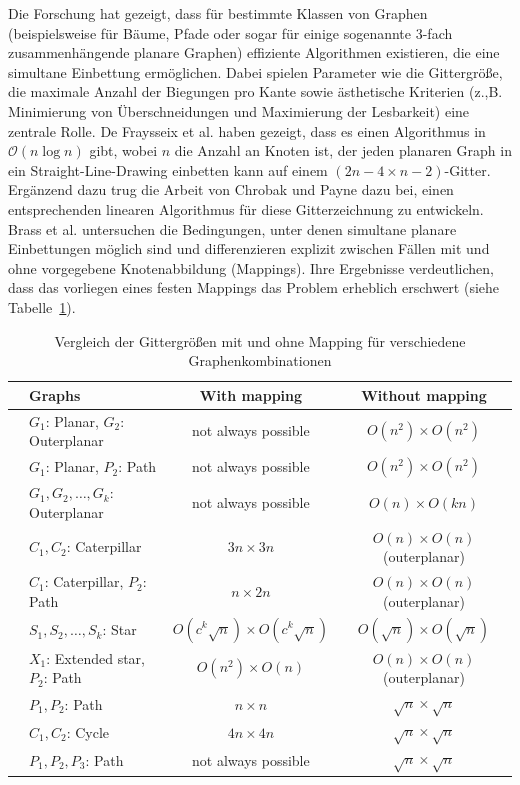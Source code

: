 \documentclass[bachelor, german]{algothesis}
\begin{document}
Die Forschung hat gezeigt, dass für bestimmte Klassen von Graphen (beispielsweise für Bäume, Pfade oder sogar für einige sogenannte 3-fach zusammenhängende planare Graphen) effiziente Algorithmen existieren, die eine simultane Einbettung ermöglichen. Dabei spielen Parameter wie die Gittergröße, die maximale Anzahl der Biegungen pro Kante sowie ästhetische Kriterien (z.,B. Minimierung von Überschneidungen und Maximierung der Lesbarkeit) eine zentrale Rolle.\newline
De Fraysseix et al. \cite{DeFraysseix1990} haben gezeigt, dass es einen Algorithmus in $\mathcal{O}(n \log n)$ gibt, wobei $n$ die Anzahl an Knoten ist, der jeden planaren Graph in ein Straight-Line-Drawing einbetten kann auf einem $(2n-4\times n-2)$-Gitter. Ergänzend dazu trug die Arbeit von Chrobak und Payne \cite{CHROBAK1995241} dazu bei, einen entsprechenden linearen Algorithmus für diese Gitterzeichnung zu entwickeln.\newline
Brass et al. \cite{BRASS2007117}  untersuchen die Bedingungen, unter denen simultane planare Einbettungen möglich sind und differenzieren explizit zwischen Fällen mit und ohne vorgegebene Knotenabbildung (Mappings). Ihre Ergebnisse verdeutlichen, dass das vorliegen eines festen Mappings das Problem erheblich erschwert (siehe Tabelle~\ref{tab:graph-mapping}).\newline
\begin{table}[H]
\centering
\begin{tabular}{llcc}
\toprule
\textbf{} & \textbf{Graphs} & \textbf{With mapping} & \textbf{Without mapping} \\
\midrule
& $G_1$: Planar, $G_2$: Outerplanar & not always possible & $O(n^2) \times O(n^2)$ \\
& $G_1$: Planar, $P_2$: Path & not always possible & $O(n^2) \times O(n^2)$ \\
& $G_1, G_2, \dots, G_k$: Outerplanar & not always possible & $O(n) \times O(kn)$ \\
& $C_1, C_2$: Caterpillar & $3n \times 3n$ & $O(n) \times O(n)$ (outerplanar) \\
& $C_1$: Caterpillar, $P_2$: Path & $n \times 2n$ & $O(n) \times O(n)$ (outerplanar) \\
& $S_1, S_2, \dots, S_k$: Star & $O(c^k \sqrt{n}) \times O(c^k \sqrt{n})$ & $O(\sqrt{n}) \times O(\sqrt{n})$ \\
& $X_1$: Extended star, $P_2$: Path & $O(n^2) \times O(n)$ & $O(n) \times O(n)$ (outerplanar) \\
& $P_1, P_2$: Path & $n \times n$ & $\sqrt{n} \times \sqrt{n}$ \\
& $C_1, C_2$: Cycle & $4n \times 4n$ & $\sqrt{n} \times \sqrt{n}$ \\
& $P_1, P_2, P_3$: Path & not always possible & $\sqrt{n} \times \sqrt{n}$ \\
\bottomrule
\end{tabular}
\caption{Vergleich der Gittergrößen mit und ohne Mapping für verschiedene Graphenkombinationen\protect\footnotemark}
\label{tab:graph-mapping}
\end{table}
\end{document}
